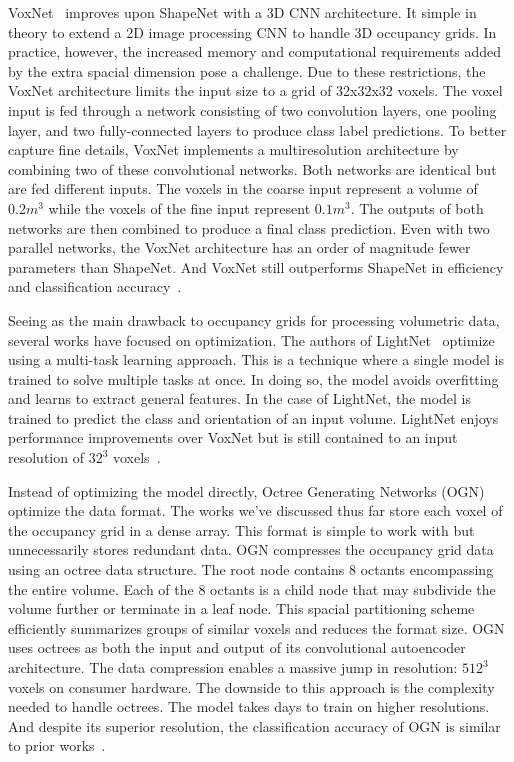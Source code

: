 VoxNet~\cite{Maturana2015} improves upon ShapeNet with a 3D CNN architecture. It simple in theory to extend a 2D image processing CNN to handle 3D occupancy grids. In practice, however, the increased memory and computational requirements added by the extra spacial dimension pose a challenge. Due to these restrictions, the VoxNet architecture limits the input size to a grid of 32x32x32 voxels. The voxel input is fed through a network consisting of two convolution layers, one pooling layer, and two fully-connected layers to produce class label predictions. To better capture fine details, VoxNet implements a multiresolution architecture by combining two of these convolutional networks. Both networks are identical but are fed different inputs. The voxels in the coarse input represent a volume of $0.2m^3$ while the voxels of the fine input represent $0.1m^3$. The outputs of both networks are then combined to produce a final class prediction. Even with two parallel networks, the VoxNet architecture has an order of magnitude fewer parameters than ShapeNet. And VoxNet still outperforms ShapeNet in efficiency and classification accuracy~\cite{Maturana2015}.

Seeing as the main drawback to occupancy grids for processing volumetric data, several works have focused on optimization. The authors of LightNet~\cite{Ye2016} optimize using a multi-task learning approach. This is a technique where a single model is trained to solve multiple tasks at once. In doing so, the model avoids overfitting and learns to extract general features. In the case of LightNet, the model is trained to predict the class and orientation of an input volume. LightNet enjoys performance improvements over VoxNet but is still contained to an input resolution of $32^3$ voxels~\cite{Ye2016}. 

Instead of optimizing the model directly, Octree Generating Networks (OGN)~\cite{Tatarchenko2017} optimize the data format. The works we've discussed thus far store each voxel of the occupancy grid in a dense array. This format is simple to work with but unnecessarily stores redundant data. OGN compresses the occupancy grid data using an octree data structure. The root node contains 8 octants encompassing the entire volume. Each of the 8 octants is a child node that may subdivide the volume further or terminate in a leaf node. This spacial partitioning scheme efficiently summarizes groups of similar voxels and reduces the format size. OGN uses octrees as both the input and output of its convolutional autoencoder architecture. The data compression enables a massive jump in resolution: $512^3$ voxels on consumer hardware. The downside to this approach is the complexity needed to handle octrees. The model takes days to train on higher resolutions. And despite its superior resolution, the classification accuracy of OGN is similar to prior works~\cite{Tatarchenko2017}.


